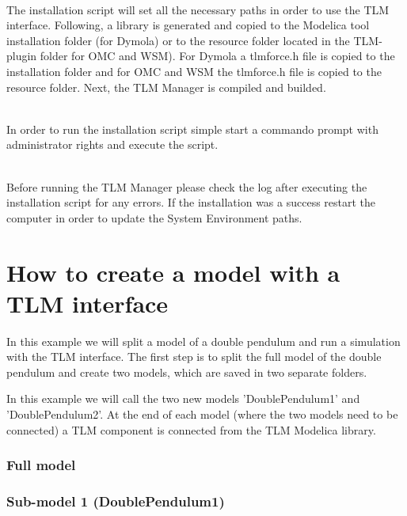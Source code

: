 ~\\ The installation script will set all the necessary paths in order to use the TLM interface. Following, a library is generated and copied to the Modelica tool installation folder (for Dymola) or to the resource folder located in the TLM-plugin folder for OMC and WSM). For Dymola a tlmforce.h file is copied to the installation folder and for OMC and WSM the tlmforce.h file is copied to the resource folder. Next, the TLM Manager is compiled and builded.

~\\In order to run the installation script simple start a commando prompt with administrator rights and execute the script.

~\\Before running the TLM Manager please check the log after executing the installation script for any errors. If the installation was a success restart the computer in order to update the System Environment paths.

\section{How to create a model with a TLM interface}
In this example we will split a model of a double pendulum and run a simulation with the TLM interface. The first step is to split the full model of the double pendulum and create two models, which are saved in two separate folders.

In this example we will call the two new models 'DoublePendulum1' and 'DoublePendulum2'. At the end of each model (where the two models need to be connected) a TLM component is connected from the TLM Modelica library.

\subsubsection{Full model}

\subsubsection{Sub-model 1 (DoublePendulum1)}

~\\\\\\

